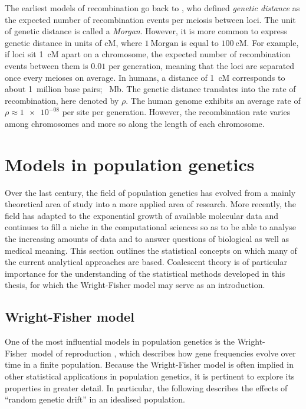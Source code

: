 The earliest models of recombination go back to \citet{haldane1919}, who defined \emph{genetic distance}
as the expected number of recombination events per meiosis between  loci.
The unit of genetic distance is called a \emph{Morgan}.
However, it is more common to express genetic distance in units of \gls{cM}, where ${1~\text{Morgan}}$ is equal to ${100~\text{cM}}$.
For example, if  loci sit 1~\gls{cM} apart on a chromosome, the expected number of recombination events between them is $0.01$ per generation, meaning that the  loci are separated once every  meioses on average.
In humans, a distance of 1~\gls{cM} corresponds to about 1~million base pairs; ~\gls{Mb}.
The genetic distance translates into the rate of recombination, here denoted by $\rho$.
The human genome exhibits an average rate of ${\rho\approx\num{1e-08}}$ per site per generation.
However, the recombination rate varies among chromosomes and more so along the length of each chromosome.



%
\section{Models in population genetics}
\label{sec:popgen}
%

Over the last century, the field of population genetics has evolved from a mainly theoretical area of study into a more applied area of research.
More recently, the field has adapted to the exponential growth of available molecular data and continues to fill a niche in the computational sciences so as to be able to analyse the increasing amounts of data and to answer questions of biological as well as medical meaning.
This section outlines the statistical concepts on which many of the current analytical approaches are based.
Coalescent theory is of particular importance for the understanding of the statistical methods developed in this thesis, for which the Wright-Fisher model may serve as an introduction.

%
\subsection{Wright-Fisher model}
%

One of the most influential models in population genetics is the Wright-Fisher~model of reproduction \citep{Fisher1930,Wright1931}, which describes how gene frequencies evolve over time in a finite population.
Because the Wright-Fisher model is often implied in other statistical applications in population genetics, it is pertinent to explore its properties in greater detail.
In particular, the following describes the effects of ``random genetic drift'' in an idealised population.

